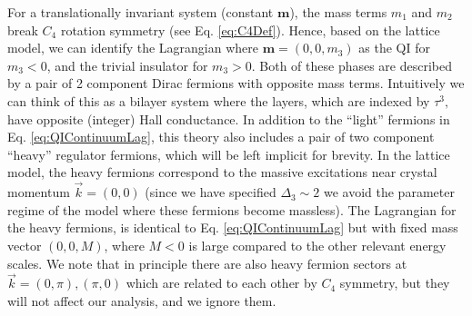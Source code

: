 \documentclass[%
 reprint,
 amsmath,amssymb,
 aps,
]{revtex4-1}
\begin{document}
For a translationally invariant system (constant $\bm{m}$), the mass terms $m_1$ and $m_2$ break $C_4$ rotation symmetry (see Eq. \ref{eq:C4Def}). Hence, based on the lattice model, we can identify the Lagrangian where $\bm{m} = (0,0,m_3)$ as the QI for $m_3 < 0$, and the trivial insulator for $m_3 > 0$. Both of these phases are described by a pair of 2 component Dirac fermions with opposite mass terms. Intuitively we can think of this as a bilayer system where the layers, which are indexed by $\tau^3,$ have opposite (integer) Hall conductance. In addition to the ``light'' fermions in Eq. \ref{eq:QIContinuumLag}, this theory also includes a pair of two component  ``heavy'' regulator fermions, which will be left implicit for brevity. In the lattice model, the heavy fermions correspond to the massive excitations near crystal momentum $\vec{k} = (0,0)$ (since we have specified $\Delta_3\sim 2$ we avoid the parameter regime of the model where these fermions become massless). The Lagrangian for the heavy fermions, is identical to Eq. \ref{eq:QIContinuumLag} but with fixed mass vector $(0,0,M)$, where $M<0$ is large compared to the other relevant energy scales. We note that in principle there are also heavy fermion sectors at $\vec{k}=(0,\pi), (\pi, 0)$ which are related to each other by $C_4$ symmetry, but they will not affect our analysis, and we ignore them.
\end{document}
